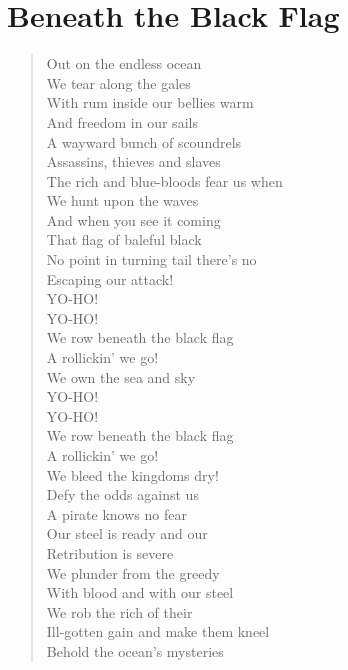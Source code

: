 \documentclass[11pt]{article}
\begin{document}
\section{Beneath the Black Flag}
\label{sec:org1d26b33}
\begin{verse}
Out on the endless ocean\\
We tear along the gales\\
With rum inside our bellies warm\\
And freedom in our sails\\
\vspace*{1em}
A wayward bunch of scoundrels\\
Assassins, thieves and slaves\\
The rich and blue-bloods fear us when\\
We hunt upon the waves\\
\vspace*{1em}
And when you see it coming\\
That flag of baleful black\\
No point in turning tail there's no\\
Escaping our attack!\\
YO-HO!\\
YO-HO!\\
We row beneath the black flag\\
A rollickin' we go!\\
We own the sea and sky\\
YO-HO!\\
YO-HO!\\
We row beneath the black flag\\
A rollickin' we go!\\
We bleed the kingdoms dry!\\
\vspace*{1em}
Defy the odds against us\\
A pirate knows no fear\\
Our steel is ready and our\\
Retribution is severe\\
\vspace*{1em}
We plunder from the greedy\\
With blood and with our steel\\
We rob the rich of their\\
Ill-gotten gain and make them kneel\\
\vspace*{1em}
Behold the ocean's mysteries\\

\end{verse}
\end{document}
